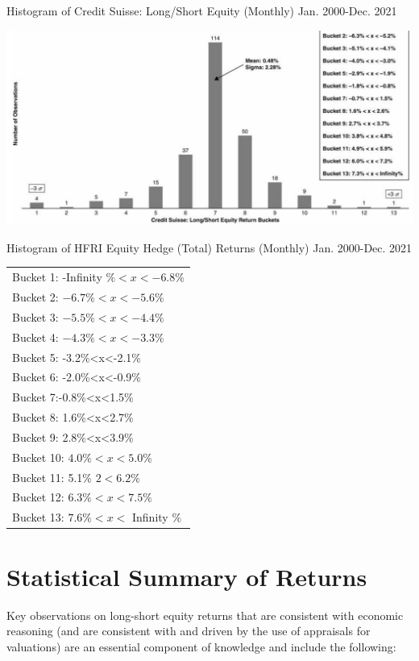 \documentclass[11pt]{article}
\begin{document}
Histogram of Credit Suisse: Long/Short Equity (Monthly) Jan. 2000-Dec. 2021

\begin{center}
\includegraphics[max width=\textwidth]{2024_04_09_92122b5eb0776b473e03g-5(2)}
\end{center}

Histogram of HFRI Equity Hedge (Total) Returns (Monthly) Jan. 2000-Dec. 2021

\begin{center}
\begin{tabular}{l}
Bucket 1: -Infinity $\%<x<-6.8 \%$ \\
Bucket 2: $-6.7 \%<x<-5.6 \%$ \\
Bucket 3: $-5.5 \%<x<-4.4 \%$ \\
Bucket 4: $-4.3 \%<x<-3.3 \%$ \\
Bucket 5: -3.2\%<x<-2.1\% \\
Bucket 6: -2.0\%<x<-0.9\% \\
Bucket 7:-0.8\%<x<1.5\% \\
Bucket 8: 1.6\%<x<2.7\% \\
Bucket 9: 2.8\%<x<3.9\% \\
Bucket 10: $4.0 \%<x<5.0 \%$ \\
Bucket 11: 5.1\% $2<6.2 \%$ \\
Bucket 12: $6.3 \%<x<7.5 \%$ \\
Bucket 13: $7.6 \%<x<$ Infinity $\%$ \\
\hline
\end{tabular}
\end{center}

\section*{Statistical Summary of Returns}
Key observations on long-short equity returns that are consistent with economic reasoning (and are consistent with and driven by the use of appraisals for valuations) are an essential component of knowledge and include the following:
\end{document}
